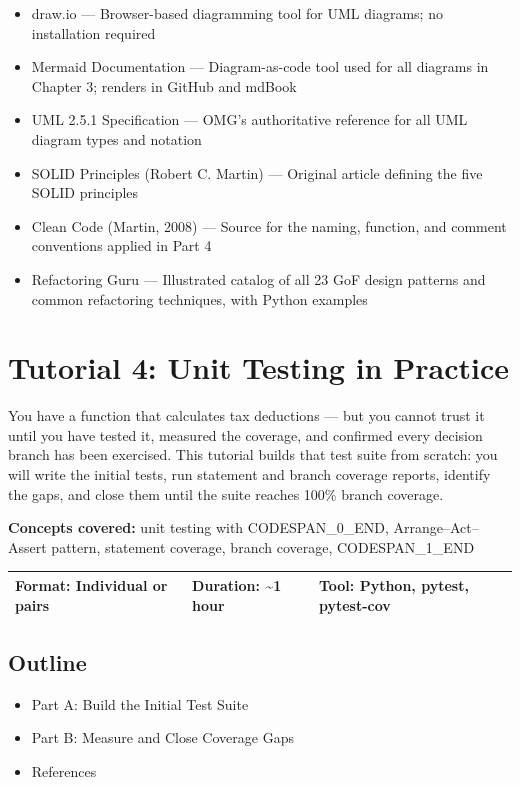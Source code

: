\documentclass[11pt,a4paper]{book}
\begin{document}
\begin{itemize}
  \item draw.io --- Browser-based diagramming tool for UML diagrams; no installation required
  \item Mermaid Documentation --- Diagram-as-code tool used for all diagrams in Chapter 3; renders in GitHub and mdBook
  \item UML 2.5.1 Specification --- OMG's authoritative reference for all UML diagram types and notation
  \item SOLID Principles (Robert C. Martin) --- Original article defining the five SOLID principles
  \item Clean Code (Martin, 2008) --- Source for the naming, function, and comment conventions applied in Part 4
  \item Refactoring Guru --- Illustrated catalog of all 23 GoF design patterns and common refactoring techniques, with Python examples
\end{itemize}


\chapter{Tutorial 4: Unit Testing in Practice}

You have a function that calculates tax deductions --- but you cannot trust it until you have tested it, measured the coverage, and confirmed every decision branch has been exercised. This tutorial builds that test suite from scratch: you will write the initial tests, run statement and branch coverage reports, identify the gaps, and close them until the suite reaches 100\% branch coverage.

\textbf{Concepts covered:} unit testing with CODESPAN\_0\_END, Arrange--Act--Assert pattern, statement coverage, branch coverage, CODESPAN\_1\_END

\begin{tabular}{lll}
\hline
\textbf{Format:} Individual or pairs & \textbf{Duration:} \textasciitilde{}1 hour & \textbf{Tool:} Python, pytest, pytest-cov \\
\hline
\end{tabular}

\medskip

\section{Outline}

\begin{itemize}
  \item Part A: Build the Initial Test Suite
  \item Part B: Measure and Close Coverage Gaps
  \item References
\end{itemize}
\end{document}
